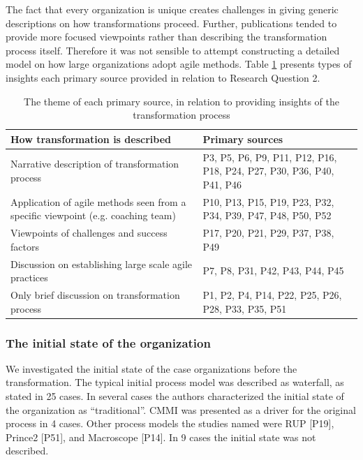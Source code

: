 \documentclass[preprint,authoryear,12pt]{elsarticle}
\begin{document}
The fact that every organization is unique creates challenges in giving generic
descriptions on how transformations proceed. Further, publications tended to
provide more focused viewpoints rather than describing the transformation
process itself. Therefore it was not sensible to attempt constructing a detailed
model on how large organizations adopt agile methods.
Table \ref{table:transformation_descriptiontypes} presents types of insights
each primary source provided in relation to Research Question 2.

\begin{table}[h]
    \centering
    \begin{tabular}{ >{\raggedright\arraybackslash}p{}
                     >{\raggedright\arraybackslash}p{} }
        \toprule
        How transformation is described   &  Primary sources  \\
        \midrule
        Narrative description of transformation process &
                P3, P5, P6, P9, P11, P12, P16, P18,
                P24, P27, P30, P36, P40, P41, P46   \\
        Application of agile methods seen from a specific viewpoint (e.g. coaching team) &
                P10, P13, P15, P19, P23, P32, P34,
                P39, P47, P48, P50, P52    \\
        Viewpoints of challenges and success factors  &
                P17, P20, P21, P29, P37, P38, P49   \\
        Discussion on establishing large scale agile practices  &
                P7, P8, P31, P42, P43, P44, P45   \\
        Only brief discussion on transformation process  &
                P1, P2, P4, P14, P22, P25, P26, P28, P33, P35, P51  \\
        \bottomrule
    \end{tabular}
    \caption{The theme of each primary source, in relation to providing
             insights of the transformation process}
    \label{table:transformation_descriptiontypes}
\end{table}


\subsubsection{The initial state of the organization}

We investigated the initial state of the case organizations before the
transformation. The typical initial process model was described as waterfall, as
stated in 25 cases. In several cases the authors characterized the initial state
of the organization as ``traditional''. CMMI was presented as a driver for the
original process in 4 cases. Other process models the studies named were RUP
[P19], Prince2 [P51], and Macroscope [P14]. In 9 cases the initial state was not
described.
\end{document}
